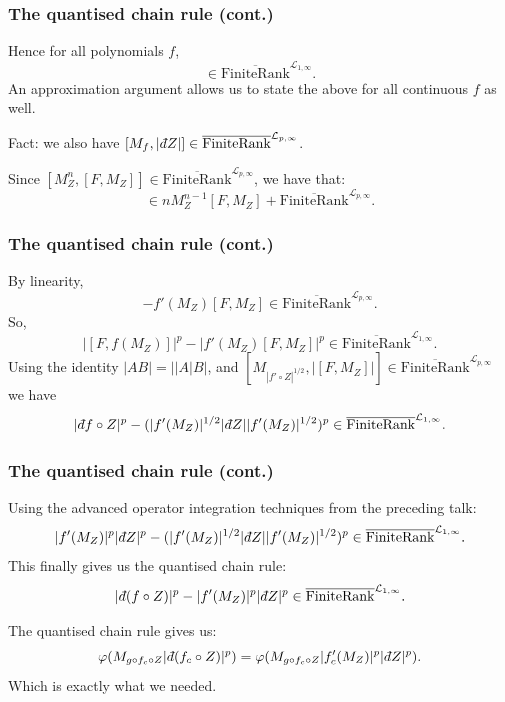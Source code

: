 \documentclass{beamer} %
\theoremstyle{definition} %
\newcommand{\Lc}{\mathcal{L}}
\newcommand{\FiniteRank}{\mathrm{FiniteRank}}
\newcommand{\SepPart}[1]{\overline{\FiniteRank}^{\Lc_{#1,\infty}}}
\def\qd{\,{\mathchar'26\mkern-12mu d}}
\begin{document}
\begin{frame}\frametitle{The quantised chain rule (cont.)}
    Hence for all polynomials $f$,
    \begin{equation*}
        [M_f,|\qd Z|^p] \in \SepPart{1}.
    \end{equation*}
    An approximation argument allows us to state the above for all continuous $f$ as well.
    
    Fact: we also have $[M_f,|\qd Z|] \in \SepPart{p}$.
    
    Since $[M_{Z}^n,[F,M_Z]] \in \SepPart{p}$, we have that:
    \begin{equation*}
        [F,M_{Z}^n] \in nM_Z^{n-1}[F,M_Z]+\SepPart{p}.
    \end{equation*}
\end{frame}

\begin{frame}\frametitle{The quantised chain rule (cont.)}
    By linearity,
    \begin{equation*}
        [F,f(M_Z)] - f'(M_Z)[F,M_Z] \in \SepPart{p}.
    \end{equation*}
    So,
    \begin{equation*}
        |[F,f(M_Z)]|^p - |f'(M_Z)[F,M_Z]|^p \in \SepPart{1}.
    \end{equation*}
    Using the identity $|AB| = ||A|B|$, and $[M_{|f'\circ Z|^{1/2}},|[F,M_Z]|] \in \SepPart{p}$ we have
    \begin{equation*}
        |\qd f\circ Z|^p - (|f'(M_Z)|^{1/2}|\qd Z||f'(M_Z)|^{1/2})^p \in \SepPart{1}.
    \end{equation*}
\end{frame}

\begin{frame}\frametitle{The quantised chain rule (cont.)}
    Using the advanced operator integration techniques from the preceding talk:
    \begin{equation*}
        |f'(M_Z)|^p|\qd Z|^p- (|f'(M_Z)|^{1/2}|\qd Z||f'(M_Z)|^{1/2})^p \in \SepPart{1}.
    \end{equation*}
    This finally gives us the quantised chain rule:
    \begin{equation*}
        |\qd (f\circ Z)|^p - |f'(M_Z)|^p|\qd Z|^p \in \SepPart{1}.
    \end{equation*}
\end{frame}

\begin{frame}\label{The end of the proof}
    The quantised chain rule gives us:
    \begin{equation*}
        \varphi(M_{g\circ f_c\circ Z}|\qd (f_c\circ Z)|^p) = \varphi(M_{g\circ f_c\circ Z}|f_c'(M_Z)|^p|\qd Z|^p).
    \end{equation*}
    Which is exactly what we needed.
\end{frame}
\end{document}
